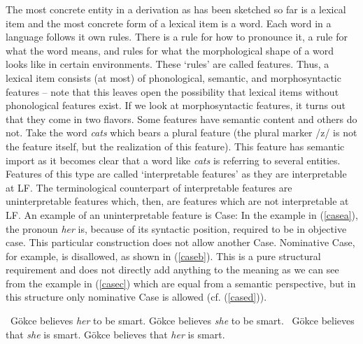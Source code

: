 The most concrete entity in a derivation as has been sketched so far is a lexical item and the most concrete form of a lexical item is a word. Each word in a language follows it own rules. There is a rule for how to pronounce it, a rule for what the word means, and rules for what the morphological shape of a word looks like in certain environments. These `rules' are called features. Thus, a lexical item consists (at most) of phonological, semantic, and morphosyntactic features -- note that this leaves open the possibility that lexical items without phonological features exist. If we look at morphosyntactic features, it turns out that they come in two flavors. Some features have semantic content and others do not. Take the word \textit{cats} which bears a plural feature (the plural marker /z/ is not the feature itself, but the realization of this feature). This feature has semantic import as it becomes clear that a word like \textit{cats} is referring to several entities. Features of this type are called `interpretable features' as they are interpretable at LF. The terminological counterpart of interpretable features are uninterpretable features which, then, are features which are not interpretable at LF. An example of an uninterpretable feature is Case: In the example in (\ref{casea}), the pronoun \textit{her} is, because of its syntactic position, required to be in objective case. This particular construction does not allow another Case. Nominative Case, for example, is disallowed, as shown in (\ref{caseb}). This is a pure structural requirement and does not directly add anything to the meaning as we can see from the example in (\ref{casec}) which are equal from a semantic perspective, but in this structure only nominative Case is allowed (cf. (\ref{cased})). 

\begin{exe}
\ex\label{case}\begin{xlist}
\ex \textcolor{white}{*}Gökce believes \textit{her} to be smart. \label{casea}
\ex *Gökce believes \textit{she} to be smart. \label{caseb}
\ex \textcolor{white}{*}Gökce believes that \textit{she} is smart. \label{casec}
\ex *Gökce believes that \textit{her} is smart. \label{cased}
\end{xlist}
\end{exe}








